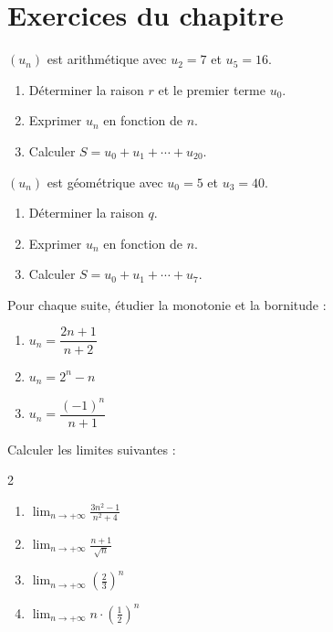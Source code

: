 \newpage
\section*{Exercices du chapitre}

\begin{exercice}
  $(u_n)$ est arithm\'{e}tique avec $u_2 = 7$ et $u_5 = 16$.
  \begin{enumerate}
    \item D\'{e}terminer la raison $r$ et le premier terme $u_0$.
    \item Exprimer $u_n$ en fonction de $n$.
    \item Calculer $S = u_0 + u_1 + \cdots + u_{20}$.
  \end{enumerate}
\end{exercice}

\begin{exercice}
  $(u_n)$ est g\'{e}om\'{e}trique avec $u_0 = 5$ et $u_3 = 40$.
  \begin{enumerate}
    \item D\'{e}terminer la raison $q$.
    \item Exprimer $u_n$ en fonction de $n$.
    \item Calculer $S = u_0 + u_1 + \cdots + u_7$.
  \end{enumerate}
\end{exercice}

\begin{exercice}
  Pour chaque suite, \'{e}tudier la monotonie et la bornitude :
  \begin{enumerate}
    \item $u_n = \dfrac{2n+1}{n+2}$
    \item $u_n = 2^n - n$
    \item $u_n = \dfrac{(-1)^n}{n+1}$
  \end{enumerate}
\end{exercice}

\begin{exercice}
  Calculer les limites suivantes :
  \begin{multicols}{2}
  \begin{enumerate}
    \item $\displaystyle\lim_{n\to+\infty} \frac{3n^2-1}{n^2+4}$
    \item $\displaystyle\lim_{n\to+\infty} \frac{n+1}{\sqrt{n}}$
    \item $\displaystyle\lim_{n\to+\infty} \left(\frac{2}{3}\right)^n$
    \item $\displaystyle\lim_{n\to+\infty} n \cdot \left(\frac{1}{2}\right)^n$
  \end{enumerate}
  \end{multicols}
\end{exercice}

